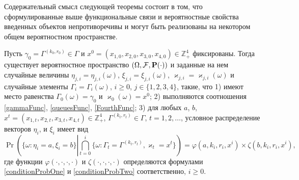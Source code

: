 \documentclass[a4paper,12pt,russian]{extarticle}
\newcommand{\ga}[1]{\Gamma^{\left( #1 \right)} }
\begin{document}
Содержательный смысл следующей теоремы состоит в том, что сформулированные выше функциональные связи и вероятностные свойства введенных объектов непротиворечивы и могут быть реализованы на некотором общем вероятностном пространстве.
\begin{theorem}
Пусть $\gamma_0=\ga{k_0,r_0} \in \Gamma$ и $x^0=(x_{1,0},x_{2,0}, x_{3,0},x_{4,0})\in \mathbb{Z}_+^4$ фиксированы.
Тогда существует вероятностное пространство $(\Omega, {\cal F}, \Pr(\cdot))$ и заданные на нем случайные величины $\eta_{j,i}=\eta_{j,i}(\omega)$, $\xi_{j,i}=\xi_{j,i}(\omega)$, 	 $\varkappa_{j,i}=\varkappa_{j,i}(\omega)$ и случайные элементы $\Gamma_i=\Gamma_i(\omega)$, $i\geqslant 0$, $j\in \{1, 2, 3, 4\}$, такие, что 1) имеют место равенства $\Gamma_0(\omega) = \gamma_0$ и $\varkappa_0(\omega)=x^0$; 2) выполняются соотношения \eqref{gammaFunc}, \eqref{queuesFunc}, \eqref{FourthFunc}; 3) для любых  $a$, $b$, $x^t=(x_{1,t},x_{2,t},x_{3,t},x_{4,t}) \in \mathbb{Z}_+^4$, $\ga{k_t,r_t} \in \Gamma$, $t = 1, 2, \ldots$, условное распределение векторов $\eta_i$, и $\xi_i$ имеет вид
\begin{equation}
\Pr \left(\{ \omega \colon \eta_i = a, \xi_i=b\} \left|\bigcap_{t=0}^{i}\{\omega\colon \Gamma_t=\ga{k_t,r_t}, \varkappa_t=x^t\}\right.\right)=
\varphi(a,k_i,r_i,x^i)\times \zeta(b,k_i,r_i,x^i),
\label{ProbablititiesToProve}
\end{equation}
где функции $\varphi(\cdot, \cdot, \cdot, \cdot)$ и $\zeta(\cdot, \cdot, \cdot, \cdot)$ определяются формулами \eqref{conditionProbOne} и \eqref{conditionProbTwo} соответственно, $i \geqslant 0$.

\label{myTheorem}
\end{theorem}
\end{document}
